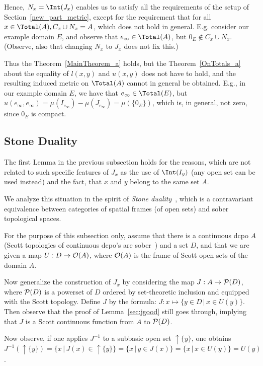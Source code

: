 Hence, $N_x = \Int(J_x)$ enables us to satisfy all the requirements
of the setup of Section~\ref{new_part_metric}, except for the requirement
that for all $x \in \Total(A), C_x \cup N_x = A$, which does not hold
in general. E.g. consider our example domain $E$, and observe that
$e_{\infty} \in \Total(A)$, but 
$0_E \not\in C_x \cup N_x$. (Observe, also that changing
$N_x$ to $J_x$ does not fix this.)

Thus the Theorem~\ref{MainTheorem_a} holds, but the 
Theorem~\ref{OnTotals_a}
about the equality of $l(x,y)$ and $u(x,y)$
does not have to hold, and the resulting
induced metric on $\Total(A)$ cannot in general be obtained. E.g.,
in our example domain $E$,
we have that
$e_{\infty} \in \Total(E)$, but 
$u(e_{\infty},e_{\infty}) = \mu(I_{e_{\infty}}) -
\mu(J_{e_{\infty}}) = \mu(\{0_E\})$, which
is, in general, not zero, since $0_E$ is compact.

\subsection{Stone Duality}

The first Lemma in the previous subsection holds for the reasons,
which are not related to such specific
features of $J_x$ as the use of $\Int(I_y)$ (any open set
can be used instead) and the fact, that
$x$ and $y$ belong to the same set $A$.

We analyze this situation in the spirit of 
{\em Stone duality}~\cite{Johnstone,Vickers}, which is a contravariant
equivalence between categories of spatial frames (of open sets)
and sober topological spaces.

For the purpose of this subsection only, assume that there is
a continuous dcpo $A$ (Scott topologies of continuous dcpo's are 
sober~\cite{Johnstone})
and a set $D$, and that we are given a map $U: D \to {\cal O}(A)$,
where ${\cal O}(A)$ is the frame of Scott open sets of the
domain $A$.

Now generalize the construction of $J_x$ by considering the map
$J: A \to {\cal P}(D)$, where ${\cal P}(D)$ is a powerset of $D$
ordered by set-theoretic inclusion and equipped with the Scott topology.
Define $J$ by the formula: $J: x \mapsto \{y \in D\,|\,x \in U(y)\}$. 
Then observe that the proof of Lemma~\ref{sec:jgood}
still goes through, implying that $J$ is a Scott continuous
function from $A$ to ${\cal P}(D)$.

Now observe, if one applies $J^{-1}$ to a subbasic
open set $\uparrow\!\!\!\{y\}$, one obtains \linebreak
$J^{-1}(\uparrow\!\!\!\{y\}) = \{x\,|\,J(x) \in \uparrow\!\!\!\{y\}\} =
\{x\,|\,y \in J(x)\} = \{x\,|\,x \in U(y)\} = U(y)$.

